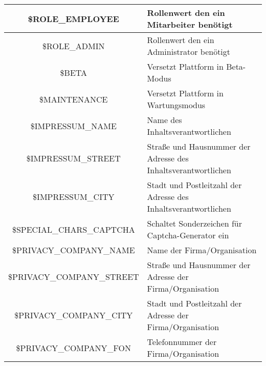 \begin{longtable}[H]{|c|l|}
		\$ROLE\_EMPLOYEE             & Rollenwert den ein Mitarbeiter benötigt                                                                                                    \\ \hline	
		\$ROLE\_ADMIN                & Rollenwert den ein Administrator benötigt                                                                                                    \\ \hline	
		\$BETA              & Versetzt Plattform in Beta-Modus                                                                                                     \\ \hline	
		\$MAINTENANCE       & Versetzt Plattform in Wartungsmodus                                                                                                     \\ \hline	
		\$IMPRESSUM\_NAME   & Name des Inhaltsverantwortlichen                                                                                                     \\ \hline
		\$IMPRESSUM\_STREET & Straße und Hausnummer der Adresse des Inhaltsverantwortlichen                                                                                                     \\ \hline	
		\$IMPRESSUM\_CITY   & Stadt und Postleitzahl der Adresse des Inhaltsverantwortlichen                                                                                                     \\ \hline	
		\$SPECIAL\_CHARS\_CAPTCHA    & Schaltet Sonderzeichen für Captcha-Generator ein                                                                                                     \\ \hline
		\$PRIVACY\_COMPANY\_NAME  & Name der Firma/Organisation                                                                                                     \\ \hline
		\$PRIVACY\_COMPANY\_STREET & Straße und Hausnummer der Adresse der Firma/Organisation                                                                                                     \\ \hline	
		\$PRIVACY\_COMPANY\_CITY   & Stadt und Postleitzahl der Adresse der Firma/Organisation                                                                                                     \\ \hline	
		\$PRIVACY\_COMPANY\_FON    & Telefonnummer der Firma/Organisation                                                                                                     \\ \hline	

\end{longtable}
